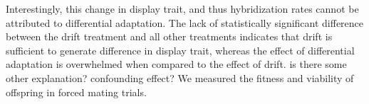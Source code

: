 Interestingly, this change in display trait, and thus hybridization rates cannot be attributed to differential adaptation. 
The lack of statistically significant difference between the drift treatment and all other treatments indicates that drift is sufficient to generate difference in display trait, whereas the effect of differential adaptation is overwhelmed when compared to the effect of drift.
is there some other explanation? confounding effect?
We measured the fitness and viability of offspring in forced mating trials.




